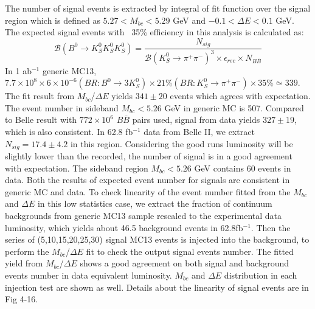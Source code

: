 The number of signal events is extracted by integral of fit function over the signal region which is defined as $5.27 < M_{bc} < 5.29 $ GeV and $-0.1 < \Delta E < 0.1$ GeV.
 The expected signal events with ~35\% efficiency in this analysis is calculated as:
 \begin{equation}
 \mathcal{B}(B^0 \to K_S^0  K_S^0  K_S^0)=
 \frac{N_{sig}}{\mathcal{B}(K_S^0\to \pi^+\pi^-)^3\times
 	\epsilon_{rec}\times N_{B\bar{B}}}
 \end{equation}
 In 1 ab$^{-1}$ generic MC13, $7.7\times 10^8 \times 6\times 10^{-6}(BR:B^0\to3K_S^0) \times 21\%(BR:K_S^0\to \pi^+\pi^-) \times 35\% \simeq 339$. The fit result from $M_{bc}$/$\Delta E$ yields $341\pm 20$ events which agrees with expectation. The event number in sideband $M_{bc}<5.26$ GeV in generic MC is 507. Compared to Belle result with $772\times 10^6$ $B\overline{B}$ pairs used, signal from data yields $327\pm 19$, which is also consistent. In 62.8 fb$^{-1}$ data from Belle II, we extract $N_{sig} = 17.4 \pm 4.2$ in this region. Considering the good runs luminosity will be slightly lower than the recorded, the number of signal is in a good agreement with expectation. The sideband region $M_{bc}<5.26$ GeV contains 60 events in data. Both the results of expected event number for signals are consistent in generic MC and data.
To check linearity of the event number fitted from the $M_{bc}$ and $\Delta E$ in this low statistics case, we extract the fraction of continuum backgrounds from generic MC13 sample rescaled to the experimental data luminosity, which yields about 46.5 background events in 62.8fb$^{-1}$. Then the series of (5,10,15,20,25,30) signal MC13 events is injected into the background, to perform the $M_{bc}$/$\Delta E$ fit to check the output signal events number. The fitted yield from $M_{bc}$/$\Delta E$ shows a good agreement on both signal and background events number in data equivalent luminosity. $M_{bc}$ and $\Delta E$ distribution in each injection test are shown as well. Details about the linearity of signal events are in Fig 4-16.

